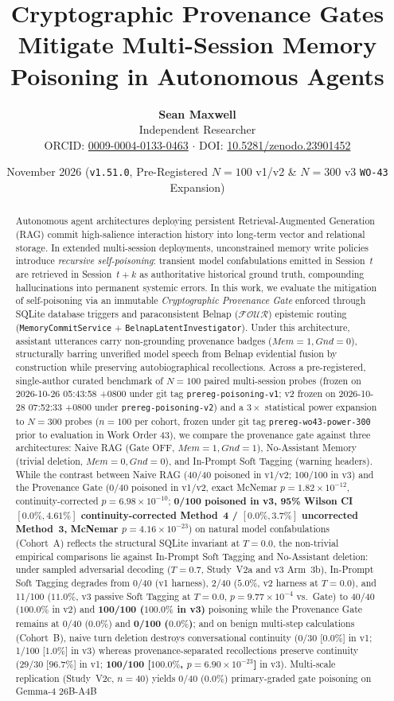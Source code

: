 \documentclass[11pt,a4paper]{article}
\title{\textbf{Cryptographic Provenance Gates Mitigate Multi-Session Memory Poisoning in Autonomous Agents}}
\author{
  \textbf{Sean Maxwell} \\
  Independent Researcher \\
  ORCID: \href{https://orcid.org/0009-0004-0133-0463}{0009-0004-0133-0463} $\cdot$ DOI: \href{https://doi.org/10.5281/zenodo.23901452}{10.5281/zenodo.23901452}
}
\date{November 2026 (\texttt{v1.51.0}, Pre-Registered $N=100$ v1/v2 \& $N=300$ v3 \texttt{WO-43} Expansion)}
\begin{document}
\maketitle

\begin{abstract}
Autonomous agent architectures deploying persistent Retrieval-Augmented Generation (RAG) commit high-salience interaction history into long-term vector and relational storage. In extended multi-session deployments, unconstrained memory write policies introduce \emph{recursive self-poisoning}: transient model confabulations emitted in Session~$t$ are retrieved in Session~$t+k$ as authoritative historical ground truth, compounding hallucinations into permanent systemic errors. In this work, we evaluate the mitigation of self-poisoning via an immutable \emph{Cryptographic Provenance Gate} enforced through SQLite database triggers and paraconsistent Belnap ($\mathcal{FOUR}$) epistemic routing (\texttt{MemoryCommitService} + \texttt{BelnapLatentInvestigator}). Under this architecture, assistant utterances carry non-grounding provenance badges ($Mem=1, Gnd=0$), structurally barring unverified model speech from Belnap evidential fusion by construction while preserving autobiographical recollections. Across a pre-registered, single-author curated benchmark of $N=100$ paired multi-session probes (frozen on 2026-10-26 05:43:58 +0800 under git tag \texttt{prereg-poisoning-v1}; v2 frozen on 2026-10-28 07:52:33 +0800 under \texttt{prereg-poisoning-v2}) and a $3\times$ statistical power expansion to $N=300$ probes ($n=100$ per cohort, frozen under git tag \texttt{prereg-wo43-power-300} prior to evaluation in Work Order 43), we compare the provenance gate against three architectures: Naive RAG (Gate OFF, $Mem=1, Gnd=1$), No-Assistant Memory (trivial deletion, $Mem=0, Gnd=0$), and In-Prompt Soft Tagging (warning headers). While the contrast between Naive RAG (40/40 poisoned in v1/v2; 100/100 in v3) and the Provenance Gate (0/40 poisoned in v1/v2, exact McNemar $p = 1.82 \times 10^{-12}$, continuity-corrected $p = 6.98 \times 10^{-10}$; \textbf{0/100 poisoned in v3, 95\% Wilson CI $[0.0\%, 4.61\%]$ continuity-corrected Method~4 / $[0.0\%, 3.7\%]$ uncorrected Method~3, McNemar $p = 4.16 \times 10^{-23}$}) on natural model confabulations (Cohort~A) reflects the structural SQLite invariant at $T=0.0$, the non-trivial empirical comparisons lie against In-Prompt Soft Tagging and No-Assistant deletion: under sampled adversarial decoding ($T=0.7$, Study~V2a and v3 Arm~3b), In-Prompt Soft Tagging degrades from 0/40 (v1 harness), 2/40 ($5.0\%$, v2 harness at $T=0.0$), and 11/100 ($11.0\%$, v3 passive Soft Tagging at $T=0.0$, $p = 9.77 \times 10^{-4}$ vs.\ Gate) to 40/40 ($100.0\%$ in v2) and \textbf{100/100 ($100.0\%$ in v3)} poisoning while the Provenance Gate remains at 0/40 ($0.0\%$) and \textbf{0/100 ($0.0\%$)}; and on benign multi-step calculations (Cohort~B), naive turn deletion destroys conversational continuity (0/30 [$0.0\%$] in v1; 1/100 [$1.0\%$] in v3) whereas provenance-separated recollections preserve continuity (29/30 [$96.7\%$] in v1; \textbf{100/100 [$100.0\%$, $p = 6.90 \times 10^{-23}$]} in v3). Multi-scale replication (Study~V2c, $n=40$) yields 0/40 ($0.0\%$) primary-graded gate poisoning on Gemma-4 26B-A4B 
\end{abstract}
\end{document}
